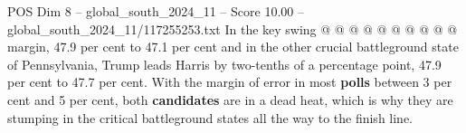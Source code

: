 \begin{textsample}{POS Dim 8 – global\_south\_2024\_11 – Score 10.00 – global\_south\_2024\_11/117255253.txt}
In the key swing @ @ @ @ @ @ @ @ @ @ margin, 47.9 per cent to 47.1 per cent and in the other crucial battleground state of Pennsylvania, Trump leads Harris by two-tenths of a percentage point, 47.9 per cent to 47.7 per cent.
With the margin of error in most \textbf{polls} between 3 per cent and 5 per cent, both \textbf{candidates} are in a dead heat, which is why they are stumping in the critical battleground states all the way to the finish line.

\end{textsample}
